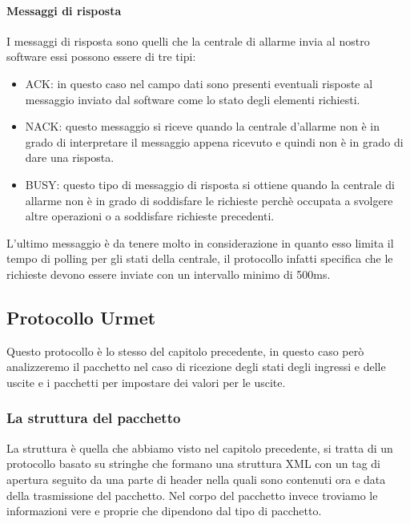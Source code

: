 \paragraph{Messaggi di risposta}
I messaggi di risposta sono quelli che la centrale di allarme invia al nostro software essi possono essere di tre tipi:
\begin{itemize}
	\item ACK: in questo caso nel campo dati sono presenti eventuali risposte al messaggio inviato dal software come lo stato degli elementi richiesti.
	\item NACK: questo messaggio si riceve quando la centrale d'allarme non è in grado di interpretare il messaggio appena ricevuto e quindi non è in grado di dare una risposta.
	\item BUSY: questo tipo di messaggio di risposta si ottiene quando la centrale di allarme non è in grado di soddisfare le richieste perchè occupata a svolgere altre operazioni o a soddisfare richieste precedenti.
\end{itemize}
L'ultimo messaggio è da tenere molto in considerazione in quanto esso limita il tempo di polling per gli stati della centrale, il protocollo infatti specifica che le richieste devono essere inviate con un intervallo minimo di 500ms.
\subsection{Protocollo Urmet}
Questo protocollo è lo stesso del capitolo precedente, in questo caso però analizzeremo il pacchetto nel caso di ricezione degli stati degli ingressi e delle uscite e i pacchetti per impostare dei valori per le uscite.
\subsubsection{La struttura del pacchetto}
La struttura è quella che abbiamo visto nel capitolo precedente, si tratta di un protocollo basato su stringhe che formano una struttura XML con un tag di apertura seguito da una parte di header nella quali sono contenuti ora e data della trasmissione del pacchetto. Nel corpo del pacchetto invece troviamo le informazioni vere e proprie che dipendono dal tipo di pacchetto.
